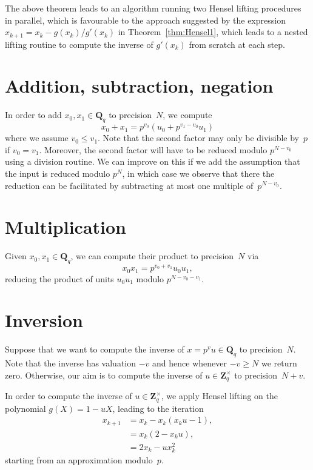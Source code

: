 \begin{rem}
The above theorem leads to an algorithm running two Hensel lifting 
procedures in parallel, which is favourable to the approach suggested 
by the expression $x_{k+1} = x_k - g(x_k) / g'(x_k)$ in 
Theorem~\ref{thm:Hensel1}, which leads to a nested lifting routine to 
compute the inverse of $g'(x_k)$ from scratch at each step.
\end{rem}

\section{Addition, subtraction, negation}

In order to add $x_0, x_1 \in \mathbf{Q}_q$ to precision~$N$, 
we compute 
\begin{equation}
x_0 + x_1 = p^{v_0} (u_0 + p^{v_1 - v_0} u_1)
\end{equation}
where we assume $v_0 \leq v_1$.  Note that the second factor may 
only be divisible by~$p$ if $v_0 = v_1$.  Moreover, the second factor 
will have to be reduced modulo $p^{N - v_0}$ using a division 
routine.  We can improve on this if we add the assumption that 
the input is reduced modulo $p^N$, in which case we observe that 
there the reduction can be facilitated by subtracting at most 
one multiple of~$p^{N-v_0}$.

\section{Multiplication}

Given $x_0, x_1 \in \mathbf{Q}_q$, we can compute their product 
to precision~$N$ via 
\begin{equation}
x_0 x_1 = p^{v_0 + v_1} u_0 u_1,
\end{equation}
reducing the product of units $u_0 u_1$ modulo $p^{N - v_0 - v_1}$.

\section{Inversion}

Suppose that we want to compute the inverse of $x = p^v u \in \mathbf{Q}_q$ 
to precision~$N$.  Note that the inverse has valuation $-v$ and hence 
whenever $-v \geq N$ we return zero.  Otherwise, our aim is to compute 
the inverse of $u \in \mathbf{Z}_q^{\times}$ to precision~$N+v$.

In order to compute the inverse of $u \in \mathbf{Z}_q^{\times}$, we 
apply Hensel lifting on the polynomial $g(X) = 1 - u X$, leading to 
the iteration
\begin{equation} \label{eq:padic-inverse}
\begin{split}
x_{k + 1} & = x_k - x_k (x_k u - 1), \\
          & = x_k (2 - x_k u), \\
          & = 2 x_k - u x_k^2
\end{split}
\end{equation}
starting from an approximation modulo~$p$.

